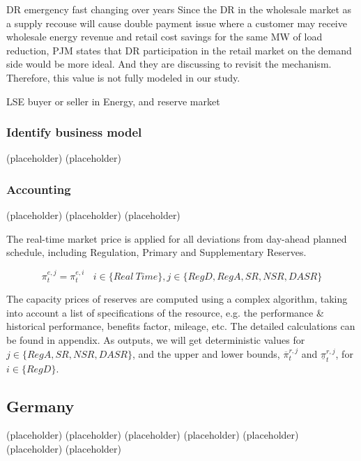 DR emergency fast changing over years \cite{Brown2015}
Since the DR in the wholesale market as a supply recouse will cause double payment issue where a customer may receive wholesale energy revenue and retail cost savings for the same MW of load reduction, PJM states that DR participation in the retail market on the demand side would be more ideal. And they are discussing to revisit the mechanism. Therefore, this value is not fully modeled in our study.

LSE
buyer or seller in Energy, and reserve market

\subsubsection{Identify business model}

(placeholder)
\newpage
(placeholder)
\newpage

\subsubsection{Accounting}
(placeholder)
\newpage
(placeholder)
\newpage
(placeholder)
\newpage




The real-time market price is applied for all deviations from day-ahead planned schedule, including Regulation, Primary and Supplementary Reserves.

\begin{equation*}
\pi_t^{e,j} = \pi_t^{e,i} ~~~~ i \in \{Real~Time\}, j \in \{RegD, RegA, SR, NSR, DASR\}
\end{equation*}

The capacity prices of reserves are computed using a complex algorithm, taking into account a list of specifications of the resource, e.g. the performance \& historical performance, benefits factor, mileage, etc. The detailed calculations can be found in appendix. As outputs, we will get deterministic values for $j \in \{RegA, SR, NSR, DASR\}$, and the upper and lower bounds, $\overline{\pi}_t^{r,j}$ and $\underline{\pi}_t^{r,j}$, for $i \in \{RegD\}$.


\subsection{Germany}
(placeholder)
\newpage
(placeholder)
\newpage
(placeholder)
\newpage
(placeholder)
\newpage
(placeholder)
\newpage
(placeholder)
\newpage
(placeholder)
\newpage

